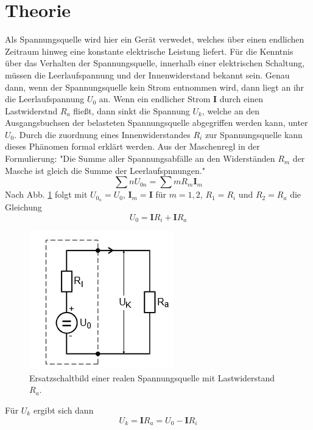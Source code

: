 \section{Theorie}
\label{sec:Theorie}
Als Spannungsquelle wird hier ein Gerät verwedet, welches über einen endlichen Zeitraum hinweg eine konstante elektrische Leistung liefert.
Für die Kenntnis über das Verhalten der Spannungsquelle, innerhalb einer elektrischen Schaltung, müssen die Leerlaufspannung und der Innenwiderstand bekannt sein.
Genau dann, wenn der Spannungsquelle kein Strom entnommen wird, dann liegt an ihr die Leerlaufspannung $U_0$ an.
Wenn ein endlicher Strom $\symbf{I}$ durch einen Lastwiderstnd $R_a$ fließt, dann sinkt die Spannung $U_k$, welche an den Ausgangsbuchsen der belasteten Spannungsquelle abgegriffen werden kann, unter $U_0$.
Durch die zuordnung eines Innenwiderstandes $R_i$ zur Spannungsquelle kann dieses Phänomen formal erklärt werden.
Aus der Maschenregl in der Formulierung: "Die Summe aller Spannungsabfälle an den Widerständen $R_m$ der Masche ist gleich die Summe der Leerlaufspnnungen."
\begin{equation}
  \sum\limits{n} U_{0n} = \sum\limits{m} R_m \symbf{I}_m
  \label{eqn:eq1}
\end{equation} 
Nach Abb. \ref{fig:abb1} folgt mit $U_{0_n} = U_0$, $\symbf{I}_m = \symbf{I}$ für $m = 1, 2$, $R_1 = R_i$ und $R_2 = R_a$ die Gleichung
\begin{equation}
  U_0 = \symbf{I} R_i + \symbf{I} R_a
  \label{eqn:eq2}
\end{equation}
\begin{figure}
  \centering
  \includegraphics{data/abb1.jpg}
  \caption{Ersatzschaltbild einer realen Spannungsquelle mit Lastwiderstand $R_a$. \cite{V301}}
  \label{fig:abb1}
\end{figure}
Für $U_k$ ergibt sich dann
\begin{equation}
  U_k = \symbf{I} R_a = U_0 - \symbf{I} R_i
  \label{eqn:eq3}
\end{equation}
